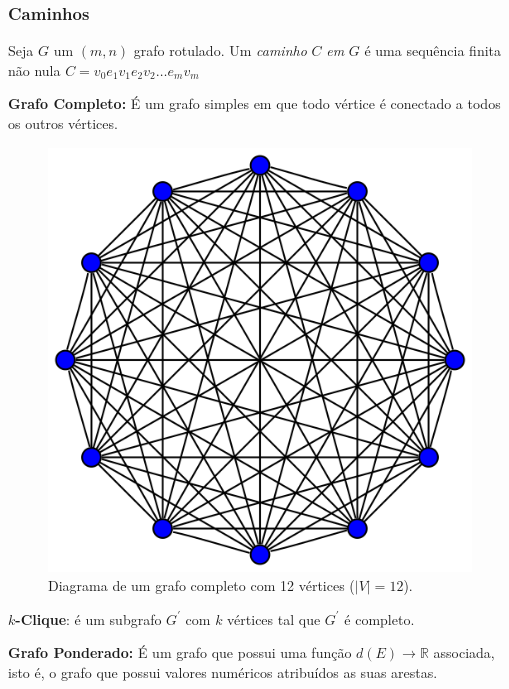 \documentclass[a4paper,12pt]{article}
\begin{document}
\subsubsection*{Caminhos}

Seja $G$ um $(m, n)$ grafo rotulado. Um \textit{caminho} $C$ \textit{em} $G$ é uma sequência finita não nula $C = v_0e_1v_1e_2v_2\dots e_mv_m$

\begin{center}
	\begin{minipage}{0.9 \linewidth}
		\textbf{Grafo Completo:} É um grafo simples em que todo vértice é conectado a todos os outros vértices.
	\end{minipage}
\end{center}

\begin{figure}[H]
	\begin{center}
		\includegraphics[width=0.4\linewidth]{figures/grafocompleto.png}
	\end{center}
	\caption{Diagrama de um grafo completo com 12 vértices ($|V| = 12$).}
	\label{fig:grafocompleto}
\end{figure}

\begin{center}
	\begin{minipage}{0.9 \linewidth}
		\textbf{$k$-Clique}: é um subgrafo $G^\prime$ com $k$ vértices tal que $G^\prime$ é completo.
	\end{minipage}
\end{center}

\begin{center}
	\begin{minipage}{0.9 \linewidth}
		\textbf{Grafo Ponderado:} É um grafo que possui uma função $d(E) \rightarrow \mathbb{R}$ associada, isto é, o grafo que possui valores numéricos atribuídos as suas arestas.
	\end{minipage}
\end{center}

{}



\end{document}
